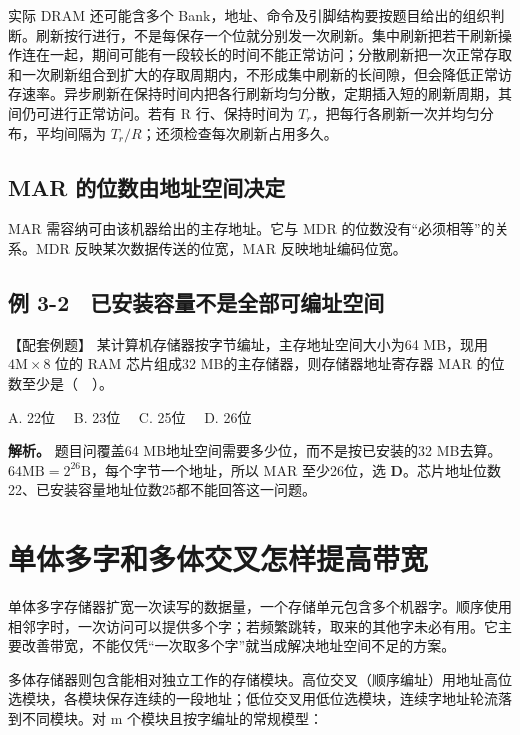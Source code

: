 实际 DRAM 还可能含多个 Bank，地址、命令及引脚结构要按题目给出的组织判断。刷新按行进行，不是每保存一个位就分别发一次刷新。集中刷新把若干刷新操作连在一起，期间可能有一段较长的时间不能正常访问；分散刷新把一次正常存取和一次刷新组合到扩大的存取周期内，不形成集中刷新的长间隙，但会降低正常访存速率。异步刷新在保持时间内把各行刷新均匀分散，定期插入短的刷新周期，其间仍可进行正常访问。若有 R 行、保持时间为 \(T_r\)，把每行各刷新一次并均匀分布，平均间隔为 \(T_r/R\)；还须检查每次刷新占用多久。

\subsection{MAR 的位数由地址空间决定}\label{CO03-06}

MAR 需容纳可由该机器给出的主存地址。它与 MDR 的位数没有``必须相等''的关系。MDR 反映某次数据传送的位宽，MAR 反映地址编码位宽。

\subsection{例 3-2　已安装容量不是全部可编址空间}\label{CO03-07}

\begin{example}[配套例题]

【配套例题】 某计算机存储器按字节编址，主存地址空间大小为64 MB，现用 \(4\mathrm M\times8\) 位的 RAM 芯片组成32 MB的主存储器，则存储器地址寄存器 MAR 的位数至少是（　）。

A. 22位　 B. 23位　 C. 25位　 D. 26位

\end{example}

\textbf{解析。} 题目问覆盖64 MB地址空间需要多少位，而不是按已安装的32 MB去算。\(64\mathrm{MB}=2^{26}\mathrm B\)，每个字节一个地址，所以 MAR 至少26位，选 \textbf{D}。芯片地址位数22、已安装容量地址位数25都不能回答这一问题。

\section{单体多字和多体交叉怎样提高带宽}\label{CO03-08}

单体多字存储器扩宽一次读写的数据量，一个存储单元包含多个机器字。顺序使用相邻字时，一次访问可以提供多个字；若频繁跳转，取来的其他字未必有用。它主要改善带宽，不能仅凭``一次取多个字''就当成解决地址空间不足的方案。

多体存储器则包含能相对独立工作的存储模块。高位交叉（顺序编址）用地址高位选模块，各模块保存连续的一段地址；低位交叉用低位选模块，连续字地址轮流落到不同模块。对 m 个模块且按字编址的常规模型：

